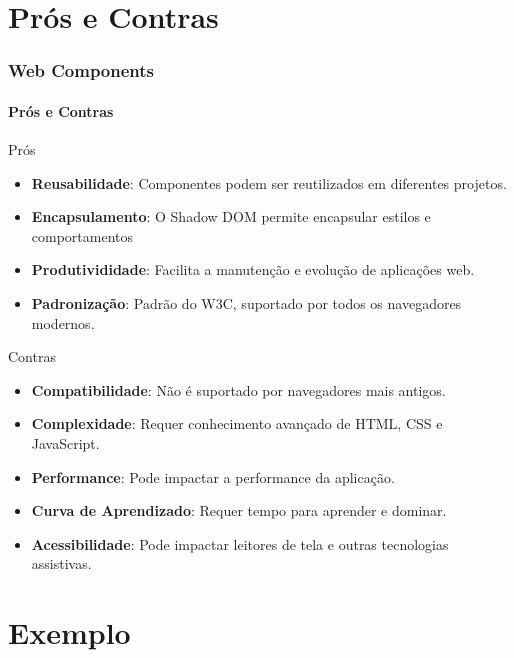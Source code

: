 \documentclass[
	9pt, %
	t, %
]{beamer}
\begin{document}
\section{Prós e Contras}

\begin{frame}
	\frametitle{Web Components}
	\framesubtitle{Prós e Contras}
	\begin{exampleblock}{Prós}
		\begin{itemize}
			\item \textbf{Reusabilidade}: Componentes podem ser reutilizados em diferentes projetos.
			\item \textbf{Encapsulamento}: O Shadow DOM permite encapsular estilos e comportamentos
			\item \textbf{Produtivididade}: Facilita a manutenção e evolução de aplicações web.
			\item \textbf{Padronização}: Padrão do W3C, suportado por todos os navegadores modernos.
		\end{itemize}
	\end{exampleblock}

	\begin{alertblock}{Contras}
		\begin{itemize}
			\item \textbf{Compatibilidade}: Não é suportado por navegadores mais antigos.
			\item \textbf{Complexidade}: Requer conhecimento avançado de HTML, CSS e JavaScript.
			\item \textbf{Performance}: Pode impactar a performance da aplicação.
			\item \textbf{Curva de Aprendizado}: Requer tempo para aprender e dominar.
			\item \textbf{Acessibilidade}: Pode impactar leitores de tela e outras tecnologias assistivas.
		\end{itemize}
	\end{alertblock}

\end{frame}

\section{Exemplo}
\end{document}
